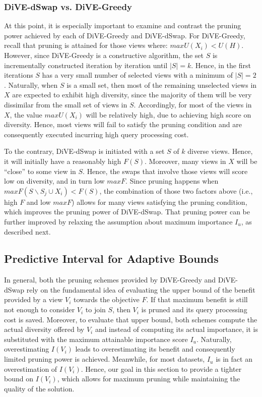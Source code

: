 \subsubsection{DiVE-dSwap vs. DiVE-Greedy} 



At this point, it is especially important to examine and contrast the pruning power achieved by each of DiVE-Greedy and DiVE-dSwap. 
%
For DiVE-Greedy, recall that pruning is attained for those views where: $maxU(X_i) < U(H)$. 
%
However, since DiVE-Greedy is a constructive algorithm, the set $S$ is incrementally constructed iteration by iteration until $|S|=k$. 
%
Hence, in the first iterations $S$ has a very small number of selected views with a minimum of $|S|=2$. 
%
Naturally, when $S$ is a small set, then most of the remaining unselected views in $X$ are expected to exhibit high diversity, since the majority of them will be very dissimilar from the small set of views in $S$.
%
Accordingly, for most of the views in $X$, the value $maxU(X_i) $ will be relatively high, due to achieving high score on diversity. 
%
Hence, most views will fail to satisfy the pruning condition and are consequently executed incurring high query processing cost. 

To the contrary, DiVE-dSwap is initiated with a set $S$ of $k$ diverse views. 
%
Hence, it will initially have a reasonably high $F(S)$. 
%
Moreover, many views in $X$ will be ``close'' to some view in $S$. 
% 
Hence, the swaps that involve those views will score low on diversity, and in turn low $maxF$.
%
Since pruning happens when $maxF(S \backslash S_j \cup X_i) < F(S)$, the combination of those two factors above (i.e., high $F$ and low $maxF$) allows for many views satisfying the pruning condition, which improves the pruning power of DiVE-dSwap. 
%
That pruning power can be further improved by relaxing the assumption about maximum importance $I_u$, as described next.




\subsection{Predictive Interval for Adaptive Bounds}
\label{subsec:adaptive-pruning}


In general, both the pruning schemes provided by DiVE-Greedy and DiVE-dSwap rely on the fundamental idea of evaluating the upper bound of the benefit provided by a view $V_i$ towards the objective $F$. 
%
If that maximum benefit is still not enough to consider $V_i$ to join $S$, then $V_i$ is pruned and its query processing cost is saved. 
%
Moreover, to evaluate that upper bound, both schemes compute the actual diversity offered by $V_i$ and instead of computing its actual importance, it is substituted with the maximum attainable importance score $I_u$. 
%
Naturally, overestimating  $I(V_i)$ leads to overestimating its benefit and consequently limited pruning power is achieved. 
%
Meanwhile, for most datasets, $I_u$ is in fact an overestimation of $I(V_i)$. 
%
Hence, our goal in this section to provide a tighter bound on $I(V_i)$, which allows for maximum pruning while maintaining the quality of the solution. 
 

